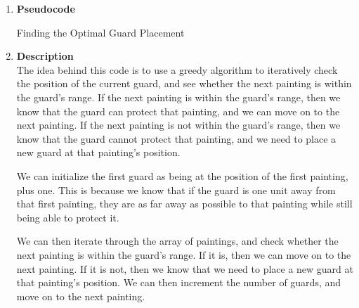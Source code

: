 \documentclass{report}
\begin{document}
    \begin{enumerate}
      \item \textbf{Pseudocode}


    \begin{algorithm}
      
      \DontPrintSemicolon
      \caption{Finding the Optimal Guard Placement}


    \end{algorithm}

    \item \textbf{Description} \\

    The idea behind this code is to use a greedy algorithm to iteratively check the position of the current guard, and see whether the next painting is within the guard's range. If the next painting is within the guard's range, then we know that the guard can protect that painting, and we can move on to the next painting. If the next painting is not within the guard's range, then we know that the guard cannot protect that painting, and we need to place a new guard at that painting's position. 

    We can initialize the first guard as being at the position of the first painting, plus one. This is because we know that if the guard is one unit away from that first painting, they are as far away as possible to that painting while still being able to protect it. 

    We can then iterate through the array of paintings, and check whether the next painting is within the guard's range. If it is, then we can move on to the next painting. If it is not, then we know that we need to place a new guard at that painting's position. We can then increment the number of guards, and move on to the next painting. \\


\end{enumerate}
\end{document}
